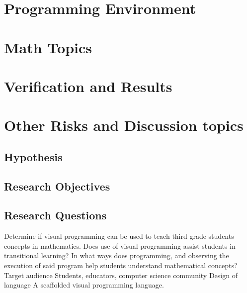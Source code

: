 \documentclass[12pt]{extarticle}
\begin{document}
\section*{Programming Environment}

\section*{Math Topics}

\section*{Verification and Results}

\section*{Other Risks and Discussion topics}

\subsection*{Hypothesis}
\subsection*{Research Objectives}
\subsection*{Research Questions}

Determine if visual programming can be used to teach third grade students concepts in mathematics.
Does use of visual programming assist students in transitional learning?
In what ways does programming, and observing the execution of said program help students understand mathematical concepts?
Target audience
Students, educators, computer science community
Design of language
A scaffolded visual programming language.
\end{document}
